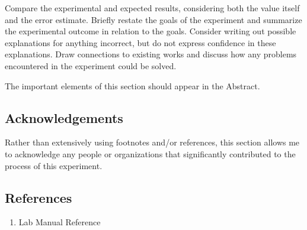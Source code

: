 \documentclass[letterpaper, 12pt]{article}
\begin{document}
		Compare the experimental and expected results, considering both the value itself and the error estimate. Briefly restate the goals of the experiment and summarize the experimental outcome in relation to the goals. Consider writing out possible explanations for anything incorrect, but do not express confidence in these explanations. Draw connections to existing works and discuss how any problems encountered in the experiment could be solved.
		
		The important elements of this section should appear in the Abstract.
	
	\subsection*{Acknowledgements}
	
		Rather than extensively using footnotes and/or references, this section allows me to acknowledge any people or organizations that significantly contributed to the process of this experiment.
	
	\subsection*{References}
	\begin{enumerate}
		\item Lab Manual Reference
	\end{enumerate}
\end{document}
